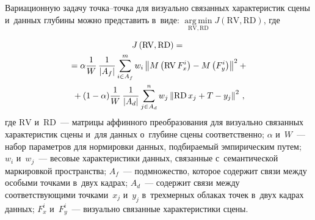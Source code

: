 \begin{multicols}{2}
  Вариационную задачу точ\-ка--точ\-ка для визуально связанных характеристик 
сцены и~данных глубины мож\-но представить в~виде:
  $\mathop{\mathrm{arg\,min}}\limits_{  \mathrm{RV}, \mathrm{RD}}
  J\left(\mathrm{RV}, \mathrm{RD}\right)$, где 
  
  \noindent
  \begin{multline*}
  J\left(\mathrm{RV}, \mathrm{RD}\right)={}\\
  {}= \alpha \displaystyle\frac{\displaystyle 1\mathstrut}{\displaystyle {W}\mathstrut} \,\displaystyle\frac{\displaystyle 1\mathstrut}{\displaystyle \vert 
{A}_{{f}} \vert\mathstrut} \sum\limits^m_{i\in A_f} {w}_i\left\|
  M\left( \mathrm{RV}\,F_x^i\right) -M\left( F_y^i\right)\right\|^2+{}\\
  {}+(1-\alpha) \displaystyle\frac{\displaystyle 1\mathstrut}{\displaystyle {W}\mathstrut}\,
  \displaystyle\frac{\displaystyle 1\mathstrut}{\displaystyle \vert {A}_{{d}}\vert \mathstrut} \sum\limits^n_{j\in A_d} {w}_j\left\| 
\mathrm{RD}\,x_j +T-y_j\right\|^2\,,
  \end{multline*}
где $\mathrm{RV}$ и~$\mathrm{RD}$~--- мат\-ри\-цы аффинного преобразования для визуально 
связанных характеристик сцены и~для данных о~глубине сцены соответственно; 
$\alpha$ и~${W}$~--- набор параметров для нормировки данных, 
подбираемый эмпирическим путем; ${w}_i$ и~${w}_j$~--- 
весовые характеристики данных, связанные с~семантической маркировкой 
про\-стран\-ст\-ва; ${A}_{{f}}$~--- подмножество, которое 
содержит связи между особыми точками в~двух кадрах; 
${A}_{{d}}$~--- содержит связи между соответствующими 
точками~$x_j$ и~$y_j$ в~трехмерных облаках точек в~двух кадрах данных; 
$F_x^i$ и~$F_y^i$~--- визуально связанные характеристики сцены. 


\end{multicols}
